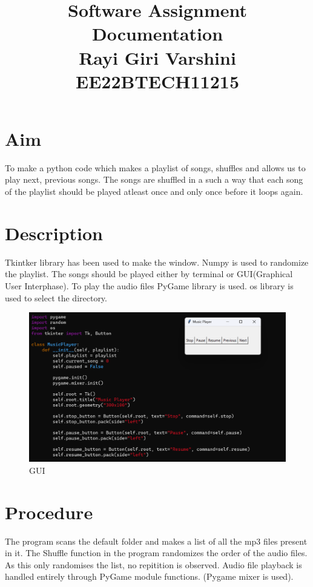 \documentclass{article}
\begin{document}
\title{Software Assignment Documentation\\ \large{Rayi Giri Varshini\\EE22BTECH11215}}
\author{}
\date{}
\maketitle

\maketitle

\section*{Aim}

	To make a python code which makes a playlist of songs, shuffles and allows us to play next, previous songs. The songs are shuffled in a such a way that each song of the playlist should be played atleast once and only once before it loops again.

\section*{Description}
	    Tkintker library has been used to make the window. Numpy is used to randomize the playlist. The songs should be played either by terminal or GUI(Graphical User Interphase). To play the audio files PyGame library is used. os library is used to select the directory.

\begin{figure}[ht]
	\centering
	\includegraphics[width=0.7\linewidth]{software image.png}
	\caption{GUI}
	\label{fig:view}
\end{figure}
\FloatBarrier

\section*{Procedure}
     The program scans the default folder and makes a list of all the mp3 files present in it. The Shuffle function in the program randomizes the order of the audio files. As this only randomises the list, no repitition is observed. Audio file playback is handled entirely through PyGame module functions. (Pygame mixer is used).
\end{document}
